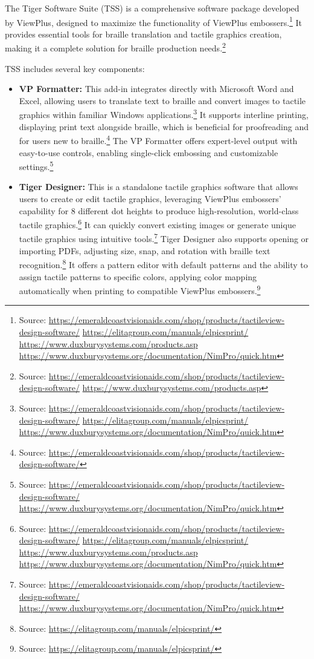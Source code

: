 The Tiger Software Suite (TSS) is a comprehensive software package developed by ViewPlus, designed to maximize the functionality of ViewPlus embossers.\footnote{Source:  \url{https://emeraldcoastvisionaids.com/shop/products/tactileview-design-software/} \url{https://elitagroup.com/manuals/elpicsprint/} \url{https://www.duxburysystems.com/products.asp} \url{https://www.duxburysystems.org/documentation/NimPro/quick.htm}} It provides essential tools for braille translation and tactile graphics creation, making it a complete solution for braille production needs.\footnote{Source:  \url{https://emeraldcoastvisionaids.com/shop/products/tactileview-design-software/} \url{https://www.duxburysystems.com/products.asp}}

TSS includes several key components:
\begin{itemize}
    \item \textbf{VP Formatter:} This add-in integrates directly with Microsoft Word and Excel, allowing users to translate text to braille and convert images to tactile graphics within familiar Windows applications.\footnote{Source:  \url{https://emeraldcoastvisionaids.com/shop/products/tactileview-design-software/} \url{https://elitagroup.com/manuals/elpicsprint/} \url{https://www.duxburysystems.org/documentation/NimPro/quick.htm}} It supports interline printing, displaying print text alongside braille, which is beneficial for proofreading and for users new to braille.\footnote{Source:  \url{https://emeraldcoastvisionaids.com/shop/products/tactileview-design-software/}} The VP Formatter offers expert-level output with easy-to-use controls, enabling single-click embossing and customizable settings.\footnote{Source:  \url{https://emeraldcoastvisionaids.com/shop/products/tactileview-design-software/} \url{https://www.duxburysystems.org/documentation/NimPro/quick.htm}}
    \item \textbf{Tiger Designer:} This is a standalone tactile graphics software that allows users to create or edit tactile graphics, leveraging ViewPlus embossers' capability for 8 different dot heights to produce high-resolution, world-class tactile graphics.\footnote{Source:  \url{https://emeraldcoastvisionaids.com/shop/products/tactileview-design-software/} \url{https://elitagroup.com/manuals/elpicsprint/} \url{https://www.duxburysystems.com/products.asp} \url{https://www.duxburysystems.org/documentation/NimPro/quick.htm}} It can quickly convert existing images or generate unique tactile graphics using intuitive tools.\footnote{Source:  \url{https://emeraldcoastvisionaids.com/shop/products/tactileview-design-software/} \url{https://www.duxburysystems.org/documentation/NimPro/quick.htm}} Tiger Designer also supports opening or importing PDFs, adjusting size, snap, and rotation with braille text recognition.\footnote{Source:  \url{https://elitagroup.com/manuals/elpicsprint/}} It offers a pattern editor with default patterns and the ability to assign tactile patterns to specific colors, applying color mapping automatically when printing to compatible ViewPlus embossers.\footnote{Source:  \url{https://elitagroup.com/manuals/elpicsprint/}}

\end{itemize}

